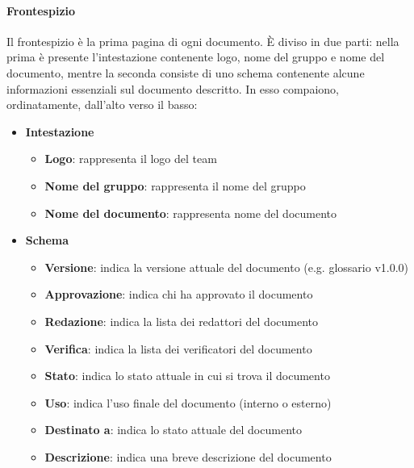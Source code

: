 \documentclass[../norme-di-progetto.tex]{subfiles}
\begin{document}
\paragraph{Frontespizio}
Il frontespizio è la prima pagina di ogni documento. È diviso in due parti: nella prima è presente l'intestazione contenente logo, nome del gruppo e nome del documento, mentre la seconda consiste di uno schema contenente alcune informazioni essenziali sul documento descritto. In esso compaiono, ordinatamente, dall'alto verso il basso:
\begin{itemize}
	\item \textbf{Intestazione}
	\begin{itemize}
		\item \textbf{Logo}: rappresenta il logo del team 
		\item \textbf{Nome del gruppo}: rappresenta il nome del gruppo
		\item \textbf{Nome del documento}: rappresenta nome del documento
	\end{itemize}
	\item \textbf{Schema}
	\begin{itemize}
		\item \textbf{Versione}: indica la versione attuale del documento (e.g. glossario v1.0.0)
		\item \textbf{Approvazione}: indica chi ha approvato il documento
		\item \textbf{Redazione}: indica la lista dei redattori del documento
		\item \textbf{Verifica}: indica la lista dei verificatori del documento
		\item \textbf{Stato}: indica lo stato attuale in cui si trova il documento
		\item \textbf{Uso}: indica l'uso finale del documento (interno o esterno)
		\item \textbf{Destinato a}: indica lo stato attuale del documento
		\item \textbf{Descrizione}: indica una breve descrizione del documento 
	\end{itemize}
\end{itemize}
\end{document}
